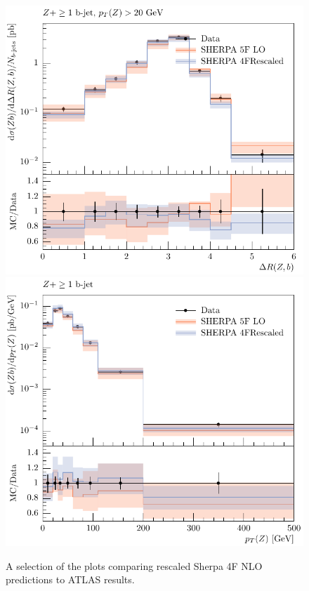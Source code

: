 \documentclass[11pt]{cernrep}
\begin{document}
\begin{figure}[htbp]
\begin{center}
   \includegraphics[scale=0.65]{figs/zbb/sherpa/d13-x01-y01_rescaled.pdf}
   \includegraphics[scale=0.65]{figs/zbb/sherpa/d15-x01-y01_rescaled.pdf}
\caption{A selection of the plots
  comparing rescaled Sherpa 4F NLO predictions to ATLAS results.}
\label{zbb-sherpa-scaled}
\end{center}
\end{figure}
\end{document}
